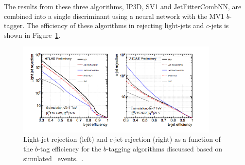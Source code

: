 The results from these three algorithms, IP3D, SV1 and JetFitterCombNN, are combined into a single discriminant using a neural network with the MV1 $b$-tagger. The efficiency of these algorithms in rejecting light-jets and $c$-jets is shown in Figure~\ref{fig:btagEff}.

\begin{figure}[h]
\centering
\includegraphics[width=0.9\textwidth]{fig/obj/btageff.png}
\caption{Light-jet rejection (left) and $c$-jet rejection (right) as a function of the $b$-tag efficiency for the
$b$-tagging algorithms discussed based on simulated \ttbar\ events.~\cite{btagptrel}.}
\label{fig:btagEff}
\end{figure}


